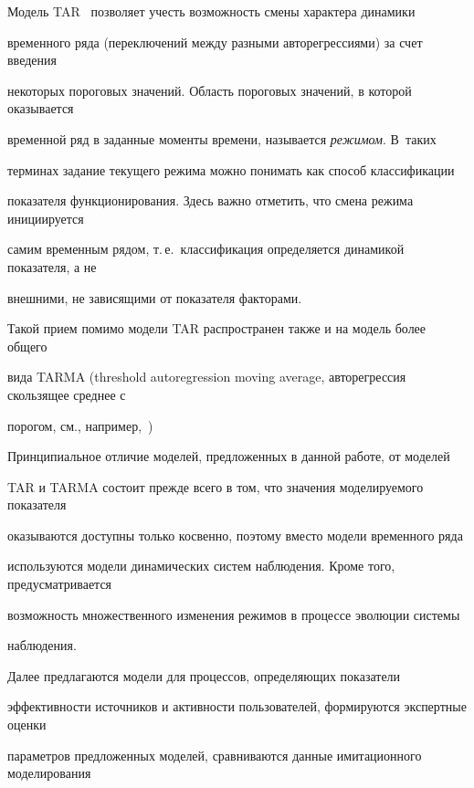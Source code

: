       


      Модель TAR~\cite{6-8} позволяет учесть возможность смены характера динамики 


временного ряда (переключений между разными авторегрессиями) за счет введения 


некоторых пороговых значений. Область пороговых значений, в которой оказывается 


временной ряд в заданные моменты времени, называется \textit{режимом}. В~таких 


терминах задание текущего режима можно понимать как способ классификации 


показателя функционирования. Здесь важно отметить, что смена режима инициируется 


самим временным рядом, т.\,е.\ классификация определяется динамикой показателя, а не 


внешними, не зависящими от показателя факторами.


      


      Такой прием помимо модели TAR распространен также и на модель более общего 


вида TARMA (threshold autoregression moving average, авторегрессия скользящее среднее с 


порогом, см., например,~\cite{7-8})


      


      Принципиальное отличие моделей, предложенных в данной работе, от моделей 


TAR и TARMA состоит прежде всего в том, что значения моделируемого показателя 


оказываются доступны только косвенно, поэтому вместо модели временного ряда 


используются модели динамических систем наблюдения. Кроме того, предусматривается 


возможность множественного изменения режимов в процессе эволюции системы 


наблюдения.


      


      Далее предлагаются модели для процессов, определяющих показатели 


эффективности источников и активности пользователей, формируются экспертные оценки 


параметров предложенных моделей, сравниваются данные имитационного моделирования 


